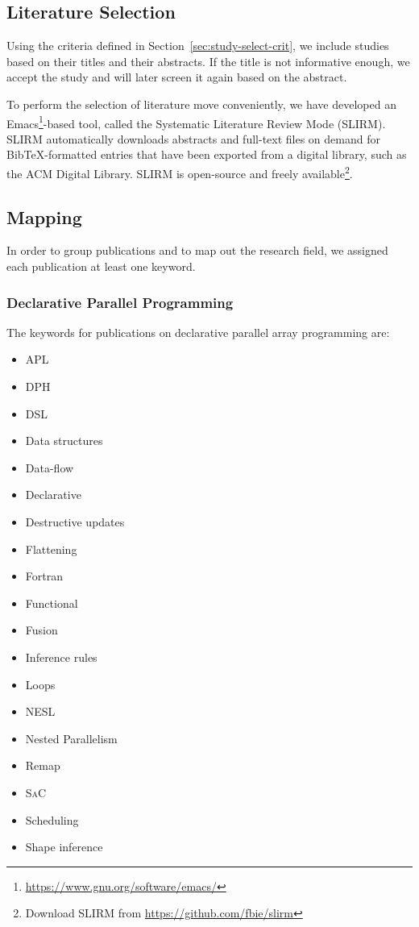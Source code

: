 \documentclass[a4paper]{article}
\newcommand{\sac}{S\textsc{a}C}
\begin{document}
\subsection{Literature Selection}
\label{sec:literature-selection}

Using the criteria defined in Section~\ref{sec:study-select-crit}, we
include studies based on their titles and their abstracts. If the
title is not informative enough, we accept the study and will later
screen it again based on the abstract.

To perform the selection of literature move conveniently, we have
developed an
Emacs\footnote{\url{https://www.gnu.org/software/emacs/}}-based tool,
called the Systematic Literature Review Mode (SLIRM). SLIRM
automatically downloads abstracts and full-text files on demand for
BibTeX-formatted entries that have been exported from a digital
library, such as the ACM Digital Library. SLIRM is open-source and
freely available\footnote{Download SLIRM from
  \url{https://github.com/fbie/slirm}}.

\subsection{Mapping}
\label{sec:mapping}

In order to group publications and to map out the research field, we
assigned each publication at least one keyword.

\subsubsection{Declarative Parallel Programming}

The keywords for publications on declarative parallel array
programming are:

\begin{multicols}{2}

\begin{itemize}
\item APL
\item DPH
\item DSL
\item Data structures
\item Data-flow
\item Declarative
\item Destructive updates
\item Flattening
\item Fortran
\item Functional
\item Fusion
\item Inference rules
\item Loops
\item NESL
\item Nested Parallelism
\item Remap
\item \sac{}
\item Scheduling
\item Shape inference
\end{itemize}

\end{multicols}
\end{document}
